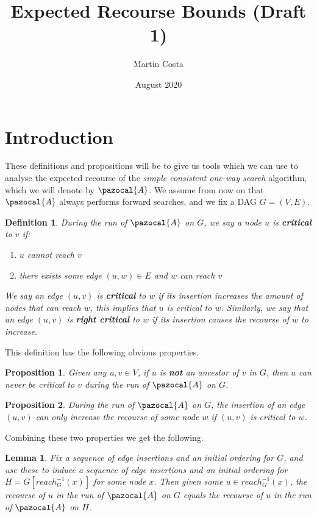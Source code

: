 \documentclass{article}
\title{Expected Recourse Bounds (Draft 1)}
\author{Martin Costa}
\date{August 2020}
\newtheorem{lemma}{Lemma}
\newtheorem{proposition}{Proposition}
\newtheorem{definition}{Definition}
\begin{document}
\maketitle

\section{Introduction}

These definitions and propositions will be to give us tools which we can use to analyse the expected recourse of the \textit{simple consistent one-way search} algorithm, which we will denote by $\pazocal{A}$. We assume from now on that $\pazocal{A}$ always performs forward searches, and we fix a DAG $G=(V,E)$.

\begin{definition}
During the run of $\pazocal{A}$ on $G$, we say a node $u$ is \textbf{critical} to $v$ if:
\begin{enumerate}
    \item $u$ cannot reach $v$
    \item there exists some edge $(u,w) \in E$ and $w$ can reach $v$ 
\end{enumerate}
We say an edge $(u,v)$ is \textbf{critical} to $w$ if its insertion increases the amount of nodes that can reach $w$, this implies that $u$ is critical to $w$. Similarly, we say that an edge $(u,v)$ is \textbf{right critical} to $w$ if its insertion causes the recourse of $w$ to increase.
\end{definition}

This definition has the following obvious properties.

\begin{proposition}
Given any $u,v \in V$, if $u$ is \textbf{not} an ancestor of $v$ in $G$, then $u$ can never be critical to $v$ during the run of $\pazocal{A}$ on $G$. 
\end{proposition}

\begin{proposition}
During the run of $\pazocal{A}$ on $G$, the insertion of an edge $(u,v)$ can only increase the recourse of some node $w$ if $(u,v)$ is critical to $w$.
\end{proposition}

Combining these two properties we get the following.

\begin{lemma}
Fix a sequence of edge insertions and an initial ordering for $G$, and use these to induce a sequence of edge insertions and an initial ordering for $H = G[reach^{-1}_{G}(x)]$ for some node $x$. Then given some $u \in reach^{-1}_{G}(x)$, the recourse of $u$ in the run of $\pazocal{A}$ on $G$ equals the recourse of $u$ in the run of $\pazocal{A}$ on $H$.
\end{lemma}
\end{document}

